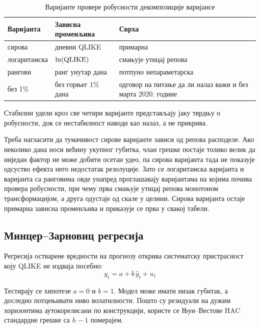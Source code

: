 \begin{table}[htbp]
\centering
\caption{Варијанте провере робусности декомпозиције варијансе}
\label{tab:robusnost}
\begin{tabularx}{\textwidth}{L{3.6cm} L{3.8cm} X}
\toprule
Варијанта & Зависна променљива & Сврха \\
\midrule
сирова                   & дневни QLIKE          & примарна \\
логаритамска             & $\ln(\mathrm{QLIKE})$          & смањује утицај репова \\
рангови                  & ранг унутар дана      & потпуно непараметарска \\
без 1\%                   & без горњег 1\% дана   & одговор на питање да ли налаз важи
и без марта 2020. године \\
\bottomrule
\end{tabularx}
\end{table}

Стабилни удели кроз све четири варијанте представљају јаку тврдњу о робусности, док
се нестабилност наводи као налаз, а не прикрива.

Треба нагласити да тумачивост сирове варијанте зависи од репова расподеле. Ако
неколико дана носи већину укупног губитка, члан грешке постаје толико велик да ниједан
фактор не може добити осетан удео, па сирова варијанта тада не показује одсуство ефекта
него недостатак резолуције. Зато се логаритамска варијанта и варијанта са
ранговима овде унапред проглашавају варијантама на којима почива
провера робусности, при чему прва смањује утицај репова монотоном трансформацијом, а друга
одустаје од скале у целини. Сирова варијанта остаје примарна зависна променљива и
приказује се прва у свакој табели.

\subsection{Минцер–Зарновиц регресија}
\label{subsec:mz}

Регресија остварене вредности на прогнозу \parencite{mincerZarnowitz1969} открива
систематску пристрасност коју QLIKE не издваја посебно:
\begin{equation}
y_t = a + b\,\hat{y}_t + u_t
\end{equation}

Тестирају се хипотезе $a = 0$ и $b = 1$. Модел може имати низак губитак, а
доследно потцењивати ниво волатилности. Пошто су резидуали на дужим хоризонтима
аутокорелисани по конструкцији, користе се Њуи–Вестове HAC стандардне грешке са $h-1$
померајем.

